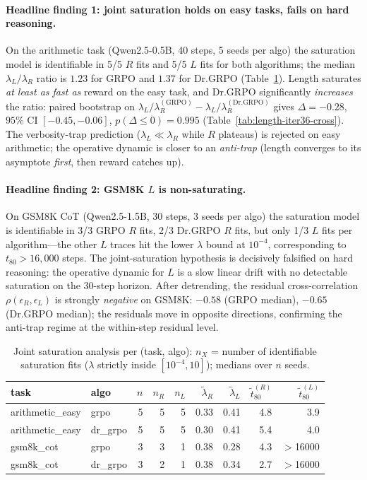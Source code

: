 \paragraph{Headline finding 1: joint saturation holds on easy tasks,
fails on hard reasoning.}
On the arithmetic task (Qwen2.5-0.5B, 40 steps, 5 seeds per algo) the
saturation model is identifiable in 5/5 $R$ fits and 5/5 $L$ fits for
both algorithms; the median $\lambda_L / \lambda_R$ ratio is $1.23$
for GRPO and $1.37$ for Dr.GRPO (Table~\ref{tab:length-iter36-summary}).
Length saturates \emph{at least as fast as} reward on the easy task,
and Dr.GRPO significantly \emph{increases} the ratio: paired
bootstrap on $\lambda_L/\lambda_R^{(\mathrm{GRPO})} -
\lambda_L/\lambda_R^{(\mathrm{Dr.GRPO})}$ gives $\Delta = -0.28$,
$95\%$ CI $[-0.45, -0.06]$, $p(\Delta \leq 0) = 0.995$
(Table~\ref{tab:length-iter36-cross}). The verbosity-trap prediction
($\lambda_L \ll \lambda_R$ while $R$ plateaus) is rejected on easy
arithmetic; the operative dynamic is closer to an \emph{anti-trap}
(length converges to its asymptote \emph{first}, then reward catches
up).

\paragraph{Headline finding 2: GSM8K $L$ is non-saturating.}
On GSM8K CoT (Qwen2.5-1.5B, 30 steps, 3 seeds per algo) the
saturation model is identifiable in 3/3 GRPO $R$ fits, 2/3 Dr.GRPO
$R$ fits, but only 1/3 $L$ fits per algorithm---the other $L$ traces
hit the lower $\lambda$ bound at $10^{-4}$, corresponding to
$t_{80} > 16{,}000$ steps. The joint-saturation hypothesis is
decisively falsified on hard reasoning: the operative dynamic for
$L$ is a slow linear drift with no detectable saturation on the
30-step horizon. After detrending, the residual cross-correlation
$\rho(\epsilon_R, \epsilon_L)$ is strongly \emph{negative} on GSM8K:
$-0.58$ (GRPO median), $-0.65$ (Dr.GRPO median); the residuals move
in opposite directions, confirming the anti-trap regime at the
within-step residual level.

\begin{table}[t]
\centering
\small
\caption{Joint saturation analysis per (task, algo): $n_X$ = number of
identifiable saturation fits ($\lambda$ strictly inside
$[10^{-4}, 10]$); medians over $n$ seeds.}
\label{tab:length-iter36-summary}
\begin{tabular}{llrrrrrrr}
\toprule
task & algo & $n$ & $n_R$ & $n_L$ & $\tilde\lambda_R$ &
$\tilde\lambda_L$ & $\tilde t_{80}^{(R)}$ & $\tilde t_{80}^{(L)}$ \\
\midrule
arithmetic\_easy & grpo    & 5 & 5 & 5 & 0.33 & 0.41 & 4.8 & 3.9 \\
arithmetic\_easy & dr\_grpo & 5 & 5 & 5 & 0.30 & 0.41 & 5.4 & 4.0 \\
gsm8k\_cot       & grpo    & 3 & 3 & 1 & 0.38 & 0.28 & 4.3 & $>$16000 \\
gsm8k\_cot       & dr\_grpo & 3 & 2 & 1 & 0.38 & 0.34 & 2.7 & $>$16000 \\
\bottomrule
\end{tabular}
\end{table}


